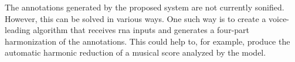 
The annotations generated by the proposed system are not
currently sonified. However, this can be solved in various
ways. One such way is to create a voice-leading algorithm
that receives \gls{rna} inputs and generates a four-part
harmonization of the annotations. This could help to, for
example, produce the automatic harmonic reduction of a
musical score analyzed by the model.
